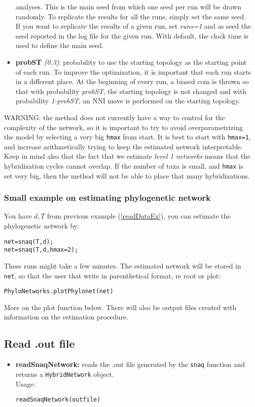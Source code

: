 \documentclass[12pt]{article}
\begin{document}
\begin{itemize}
  analyses. This is the main seed from which one seed per run will be
  drawn randomly. To replicate the results for all the runs, simply
  set the same seed. If you want to replicate the results of a given
  run, set \textit{runs=1} and as seed the seed reported in the log
  file for the given run. With default, the clock time is used to
  define the main seed.
\item \textbf{probST} \textit{(0.3)}: probability to use the starting
  topology as the starting point of each run. To improve the
  optimization, it is important that each run starts in a different
  place. At the beginning of every run, a biased coin is thrown so
  that with probability \textit{probST}, the starting topology is not
  changed and with probability \textit{1-probST}, an NNI move is
  performed on the starting topology.
\end{itemize}

WARNING: the method does not currently have a way to control for the
complexity of the network, so it is important to try to avoid
overparametrizing the model by selecting a very big \texttt{hmax} from
start. It is best to start with \texttt{hmax=1}, and increase
arithmetically trying to keep the estimated network
interpretable. Keep in mind also that the fact that we estimate
\textit{level 1 networks} means that the hybridization cycles cannot
overlap. If the number of taxa is small, and \texttt{hmax} is set very
big, then the method will not be able to place that many
hybridizations.

\subsubsection{Small example on estimating phylogenetic network}
You have $d,T$ from previous example (\ref{readDataEx}), you can
estimate the phylogenetic network by:
\begin{lstlisting}
net=snaq(T,d);
net=snaq(T,d,hmax=2);
\end{lstlisting}
These runs might take a few minutes. The estimated network will be
stored in \texttt{net}, so that the user that write in parenthetical
format, re root or plot:
\begin{lstlisting}
PhyloNetworks.plotPhylonet(net)
\end{lstlisting}
More on the plot function below. There will also be output files
created with information on the estimation procedure.

\subsection{Read .out file}
\begin{itemize}
\item \textbf{readSnaqNetwork:} reads the .out file generated by the
  \texttt{snaq} function and returns a \texttt{HybridNetwork}
  object.\\
Usage:
\begin{lstlisting}
readSnaqNetwork(outfile)
\end{lstlisting}
\end{itemize}
\end{document}
